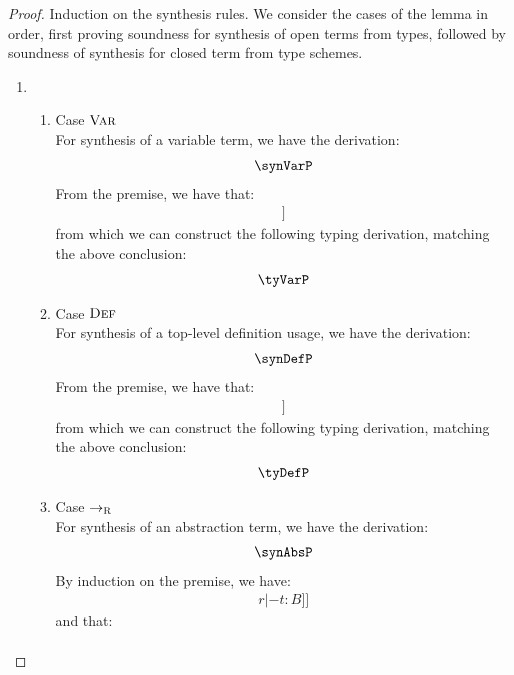 \synthSound*
\begin{proof}
Induction on the synthesis rules. We consider the cases of the lemma in order, first proving soundness for 
synthesis of open terms from types, followed by soundness of synthesis for closed term from type schemes.
\begin{enumerate}
\item \begin{enumerate}
\item Case $\textsc{Var}$ \\
        For synthesis of a variable term, we have the derivation:
        \begin{align*}
          \synVarP
        \end{align*}
        From the premise, we have that: 
        \begin{align*}
          [[ Sig |- A : Type ]]
        \end{align*}
        from which we can construct the following typing derivation, matching the above conclusion:
        \begin{align*}
          \tyVarP
        \end{align*}
\item Case $\textsc{Def}$ \\
        For synthesis of a top-level definition usage, we have the derivation:
        \begin{align*}
          \synDefP
        \end{align*}
        From the premise, we have that: 
        \begin{align*}
          [[ Sig |- inst A A' ]]
        \end{align*}
        from which we can construct the following typing derivation, matching the above conclusion:
        \begin{align*}
          \tyDefP
        \end{align*}
\item Case $\rightarrow_{\textsc{R}}$\\
        For synthesis of an abstraction term, we have the derivation:
        \begin{align*}
          \synAbsP
        \end{align*}
        By induction on the premise, we have:
        \begin{align*}
          [[  Sig; D, x : [ A ] r |- t : B ]] \tag{ih}
        \end{align*}
        and that:
        \begin{align*}

\end{align*}
\end{enumerate}
\end{enumerate}
\end{proof}
